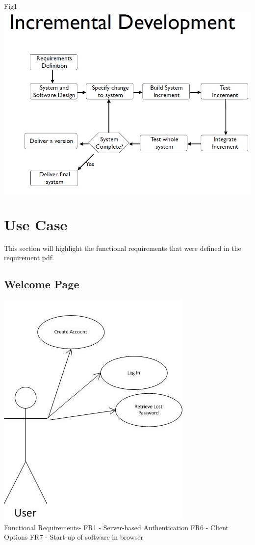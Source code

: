 \documentclass{project}
\begin{document}
Fig1
\includegraphics[scale=0.5]{incremental.jpg}\\

\newpage
\section{Use Case}
This section will highlight the functional requirements that were defined in the
requirement pdf.

\subsection{Welcome Page}
\includegraphics[scale=0.6]{WelcomePageUseCase.jpg}
\\
Functional Requirements-
FR1 - Server-based Authentication
FR6 - Client Options
FR7 - Start-up of software in browser
\end{document}
